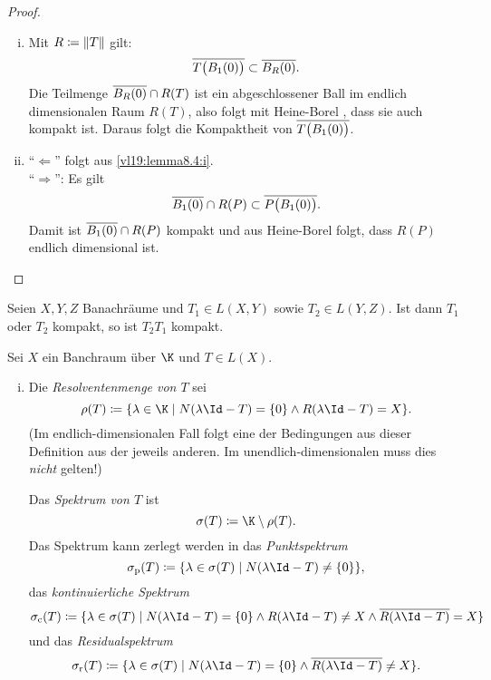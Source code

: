 \begin{proof}
    \begin{enumerate}[(i)]
        \item
            Mit $R\coloneqq \lVert T\rVert$ gilt:
            \[ \overline{T\bigl( B_1(0) \bigr)}
                \subset \overline{B_R(0)}
            . \]
            Die Teilmenge $\overline{B_R(0)}\cap R(T)$ ist ein abgeschlossener
            Ball im endlich dimensionalen Raum $R(T)$, also folgt mit
            Heine-Borel , dass sie auch kompakt ist.
            Daraus folgt die Kompaktheit von $\overline{T\bigl( B_1(0)
            \bigr)}$.
            
        \item
            \enquote{$\Leftarrow$} folgt aus \ref{vl19:lemma8.4:i}.
            \\
            \enquote{$\Rightarrow$}: Es gilt
            \[ \overline{B_1(0)}\cap R(P) \subset
                \overline{P\bigl(B_1(0)\bigr)}
            . \]
            Damit ist $\overline{B_1(0)}\cap R(P)$ kompakt und aus Heine-Borel
             folgt, dass $R(P)$ endlich dimensional ist.
    \end{enumerate}
\end{proof}

\begin{thLemma} \label{vl19:lemma8.5}
    Seien $X,Y,Z$ Banachräume und $T_1\in L(X,Y)$ sowie $T_2\in L(Y,Z)$.
    Ist dann $T_1$ oder $T_2$ kompakt, so ist $T_2T_1$ kompakt.
\end{thLemma}


\begin{thDef}[Spektrum]
    Sei $X$ ein Banchraum über $\K$ und $T\in L(X)$.
    \begin{enumerate}[(i)]
        \item
            Die \emph{Resolventenmenge von $T$} sei
            \[ \rho(T) \defeq \{ \lambda\in\K \Mid
                N(\lambda\Id-T)=\{0\} \land
                R(\lambda\Id-T)=X \}
            . \]
            (Im endlich-dimensionalen Fall folgt eine der Bedingungen aus dieser
            Definition aus der jeweils anderen. Im unendlich-dimensionalen muss
            dies \emph{nicht} gelten!)
            
            Das \emph{Spektrum von $T$} ist
            \[ \sigma(T) \defeq \K \setminus \rho(T)  . \]
            Das Spektrum kann zerlegt werden in das \emph{Punktspektrum}
            \[ \sigmap(T) \defeq \{ \lambda\in\sigma(T) \Mid
                    N(\lambda\Id-T) \neq \{0\}  \}
            , \]
            das \emph{kontinuierliche Spektrum}
            \[ \sigmac(T) \defeq \{ \lambda\in\sigma(T) \Mid
                    N(\lambda\Id-T) = \{0\}  \land
                    R(\lambda\Id-T) \neq X   \land
                    \setclosure{R(\lambda\Id-T)} = X
                \}
            \]
            und das \emph{Residualspektrum}
            \[ \sigmar(T) \defeq \{ \lambda\in\sigma(T) \Mid
                    N(\lambda\Id-T) = \{0\}  \land
                    \setclosure{R(\lambda\Id-T)} \neq X
                \}
            . \]
    \end{enumerate}
\end{thDef}

